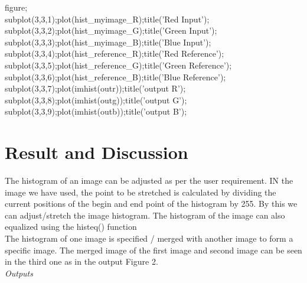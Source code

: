 \documentclass[12pt]{article}
\begin{document}
figure;\\
subplot(3,3,1);plot(hist\_myimage\_R);title('Red Input');\\
subplot(3,3,2);plot(hist\_myimage\_G);title('Green Input');\\
subplot(3,3,3);plot(hist\_myimage\_B);title('Blue Input');\\
subplot(3,3,4);plot(hist\_reference\_R);title('Red Reference');\\
subplot(3,3,5);plot(hist\_reference\_G);title('Green Reference');\\
subplot(3,3,6);plot(hist\_reference\_B);title('Blue Reference');\\
subplot(3,3,7);plot(imhist(outr));title('output R');\\
subplot(3,3,8);plot(imhist(outg));title('output G');\\
subplot(3,3,9);plot(imhist(outb));title('output B');
%
\pagebreak
\section{Result and Discussion}
The histogram of an image can be adjusted as per the user requirement. IN the image we have used, the point to be stretched is calculated by dividing the current positions of the begin and end point of the histogram by 255. By this we can adjust/stretch the image histogram. The histogram of the image can also equalized using the histeq() function\\

The histogram of one image is specified / merged with another image to form a specific image. The merged image of the first image and second image can be seen in the third one as in the output Figure 2.\\

\emph{Outputs}
\end{document}
